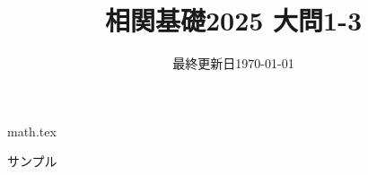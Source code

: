 \documentclass{jlreq}
\title{相関基礎2025 大問1-3}
\author{\emoji{deciduous-tree}}
\date{最終更新日\today }
\begin{document}
\maketitle
  
{math.tex}
  
\begin{thebibliography}{99}
    サンプル
\end{thebibliography}
  
\end{document}
